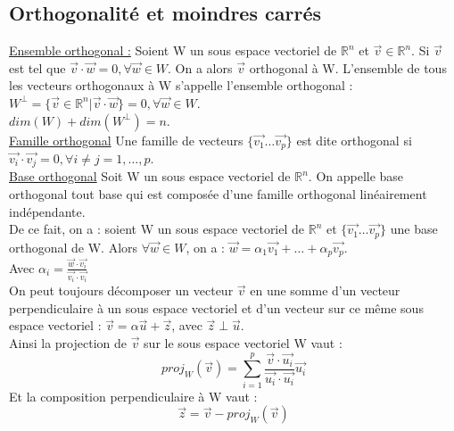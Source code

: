 \documentclass[../main.tex]{subfiles}
\begin{document}
\subsection{Orthogonalité et moindres carrés}
\quad \underline{Ensemble orthogonal :}
Soient W un sous espace vectoriel de $\mathbb{R}^n$ et $\vec{v} \in \mathbb{R}^n$. Si $\vec{v}$ est tel que $\vec{v}\cdot \vec{w} = 0, \forall \vec{w} \in W$. On a alors $\vec{v}$ orthogonal à W. L'ensemble de tous les vecteurs orthogonaux à W s'appelle l'ensemble orthogonal : $W^{\perp} = \{\vec{v} \in \mathbb{R}^n | \vec{v}\cdot \vec{w}\} = 0, \forall \vec{w} \in W$.\\
$dim(W) + dim(W^{\perp}) = n$.\\

\quad \underline{Famille orthogonal}
Une famille de vecteurs $\{\vec{v_1} \dots \vec{v_p}\}$ est dite orthogonal si $\vec{v_i} \cdot \vec{v_j} = 0, \forall i\neq j = 1,\dots, p$.\\

\quad \underline{Base orthogonal}
Soit W un sous espace vectoriel de $\mathbb{R}^n$. On appelle base orthogonal tout base qui est composée d'une famille orthogonal linéairement indépendante.\\

De ce fait, on a : soient W un sous espace vectoriel de $\mathbb{R}^n$ et $\{\vec{v_1} \dots \vec{v_p}\}$ une base orthogonal de W. Alors $\forall \vec{w} \in W$, on a : $\vec{w} = \alpha_1\vec{v_1} + \dots + \alpha_p \vec{v_p}$.\\
Avec $\alpha_i = \frac{\vec{w}\cdot \vec{v_i}}{\vec{v_i}\cdot \vec{v_i}}$\\

On peut toujours décomposer un vecteur $\vec{v}$ en une somme d'un vecteur perpendiculaire à un sous espace vectoriel et d'un vecteur sur ce même sous espace vectoriel : $\vec{v} = \alpha \vec{u} + \vec{z}$, avec $\vec{z} \perp \vec{u}$.\\
Ainsi la projection de $\vec{v}$ sur le sous espace vectoriel W vaut :\\
\begin{equation}
    proj_W(\vec{v}) = \sum_{i=1}^p\frac{\vec{v}\cdot \vec{u_i}}{\vec{u_i}\cdot \vec{u_i}} \vec{u_i}
\end{equation}
Et la composition perpendiculaire à W vaut :\\
\begin{equation}
    \vec{z} = \vec{v} - proj_W (\vec{v})
\end{equation}
\end{document}
